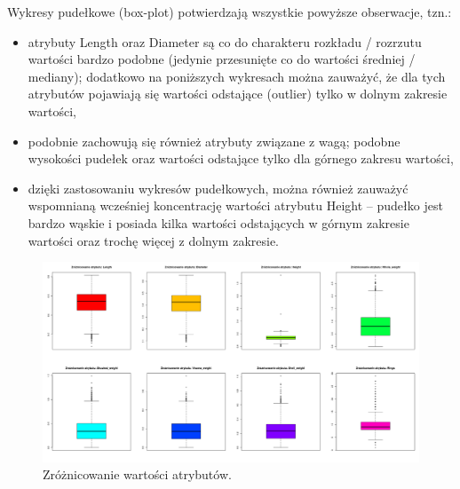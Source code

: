 \documentclass{scrartcl}
\begin{document}
  \pagebreak
  Wykresy pudełkowe (box-plot) potwierdzają wszystkie powyższe obserwacje, tzn.:
  \begin{itemize}
    \item{atrybuty Length oraz Diameter są co do charakteru rozkładu / rozrzutu wartości
          bardzo podobne (jedynie przesunięte co do wartości średniej / mediany); dodatkowo
          na poniższych wykresach można zauważyć, że dla tych atrybutów pojawiają się wartości
          odstające (outlier) tylko w dolnym zakresie wartości,}

    \item{podobnie zachowują się również atrybuty związane z wagą; podobne wysokości
      pudełek oraz wartości odstające tylko dla górnego zakresu wartości,}

    \item{dzięki zastosowaniu wykresów pudełkowych, można również zauważyć wspomnianą wcześniej
      koncentrację wartości atrybutu Height -- pudełko jest bardzo wąskie i posiada kilka wartości
      odstających w górnym zakresie wartości oraz trochę więcej z dolnym zakresie.}
  \end{itemize}
  \begin{figure}[H]
    \center
    \includegraphics[width=\textwidth]{plots/boxplots.png}
    \caption{Zróżnicowanie wartości atrybutów.}
  \end{figure}
\end{document}
